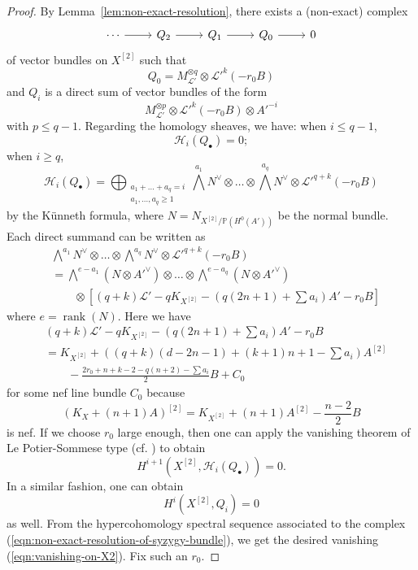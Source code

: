 \documentclass[a4paper]{amsart}
\numberwithin{equation}{section}
\theoremstyle{plain}
\theoremstyle{definition}
\theoremstyle{remark}
\numberwithin{figure}{section}
\numberwithin{table}{section}
\numberwithin{equation}{section}
\def \PP {\mathbb{P}}
\def \Hcal {\mathcal{H}}
\def \Lcal {\mathcal{L}}
\DeclareMathOperator{\rank}{rank}
\begin{document}
\begin{proof}
By Lemma~\ref{lem:non-exact-resolution}, there exists a (non-exact) complex
 \begin{equation} \label{eqn:non-exact-resolution-of-syzygy-bundle}
  \begin{tikzcd}
      \cdots \arrow{r} & Q_2 \arrow{r} & Q_1 \arrow{r} & Q_0 \arrow{r} & 0
  \end{tikzcd}
 \end{equation}
of vector bundles on $X^{[2]}$ such that
 \[
  Q_0 = M_{\Lcal'}^{\otimes q} \otimes \Lcal'^{k}(-r_0B)
 \]
and $Q_i$ is a direct sum of vector bundles of the form
 \[
  M_{\Lcal'}^{\otimes p} \otimes \Lcal'^{k}(-r_0B) \otimes A'^{-i}
 \]
with $p \leq q-1$.
Regarding the homology sheaves, we have: when $i \leq q-1$,
 \[
  \Hcal_i(Q_{\bullet}) = 0;
 \]
when $i \geq q$,
 \[
  \Hcal_i(Q_{\bullet}) = \bigoplus_{\substack{a_1 + \dots + a_q = i \\ a_1, \dots, a_q \geq 1}} \bigwedge^{a_1} N^{\vee} \otimes \dots \otimes \bigwedge^{a_q} N^{\vee} \otimes \Lcal'^{q+k}(-r_0B)
 \]
by the K\"unneth formula, where $N = N_{X^{[2]}/\PP(H^0(A'))}$ be the normal bundle.
Each direct summand can be written as
 \begin{align*}
   &\bigwedge^{a_1} N^{\vee} \otimes \dots \otimes \bigwedge^{a_q} N^{\vee} \otimes \Lcal'^{q+k}(-r_0B) \\
   &= \bigwedge^{e-a_1} (N \otimes A'^{\vee}) \otimes \dots \otimes \bigwedge^{e-a_q} (N \otimes A'^{\vee}) \\
   &\qquad \otimes \left[ (q+k)\Lcal'-qK_{X^{[2]}} - \left( q(2n+1) + \sum a_i \right) A' - r_0B \right]
 \end{align*}
where $e = \rank(N)$.
Here we have
 \begin{align*}
  &(q+k)\Lcal'-qK_{X^{[2]}} - \left( q(2n+1) + \sum a_i \right) A' - r_0B \\
  &= K_{X^{[2]}} + \left( (q+k)(d-2n-1) + (k+1)n+1 - \sum a_i \right) A^{[2]} \\
  &\qquad - \frac{2r_0 + n+k-2 - q(n+2) - \sum a_i}{2}B + C_0
 \end{align*}
for some nef line bundle $C_0$ because
 \[
  (K_X + (n+1)A)^{[2]} = K_{X^{[2]}} + (n+1)A^{[2]} - \frac{n-2}{2}B
 \]
is nef.
If we choose $r_0$ large enough, then one can apply the vanishing theorem of Le Potier-Sommese type (cf. \cite[Proposition~1.7]{EL1993}) to obtain
 \[
  H^{i+1}(X^{[2]}, \Hcal_i(Q_{\bullet})) = 0.
 \]
In a similar fashion, one can obtain
 \[
  H^{i}(X^{[2]}, Q_{i}) = 0
 \]
as well.
From the hypercohomology spectral sequence associated to the complex (\ref{eqn:non-exact-resolution-of-syzygy-bundle}), we get the desired vanishing (\ref{eqn:vanishing-on-X2}).
Fix such an $r_0$.


\end{proof}
\end{document}
